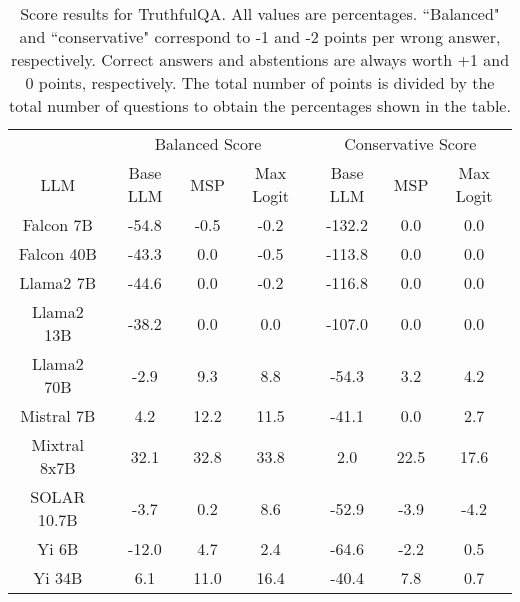 \begin{table*}
\centering
\begin{tabular}{c|c|c|c|c|c|c}
& \multicolumn{3}{c|}{Balanced Score} & \multicolumn{3}{c}{Conservative Score} \\ 
LLM & Base LLM & MSP & Max Logit & Base LLM & MSP & Max Logit\\ \hline
Falcon 7B & -54.8 & -0.5 & -0.2 & -132.2 & 0.0 & 0.0\\
Falcon 40B & -43.3 & 0.0 & -0.5 & -113.8 & 0.0 & 0.0\\
Llama2 7B & -44.6 & 0.0 & -0.2 & -116.8 & 0.0 & 0.0\\
Llama2 13B & -38.2 & 0.0 & 0.0 & -107.0 & 0.0 & 0.0\\
Llama2 70B & -2.9 & 9.3 & 8.8 & -54.3 & 3.2 & 4.2\\
Mistral 7B & 4.2 & 12.2 & 11.5 & -41.1 & 0.0 & 2.7\\
Mixtral 8x7B & 32.1 & 32.8 & 33.8 & 2.0 & 22.5 & 17.6\\
SOLAR 10.7B & -3.7 & 0.2 & 8.6 & -52.9 & -3.9 & -4.2\\
Yi 6B & -12.0 & 4.7 & 2.4 & -64.6 & -2.2 & 0.5\\
Yi 34B & 6.1 & 11.0 & 16.4 & -40.4 & 7.8 & 0.7\\
\hline
\end{tabular}
\caption{Score results for TruthfulQA. All values are percentages. ``Balanced" and ``conservative" correspond to -1 and -2 points per wrong answer, respectively. Correct answers and abstentions are always worth +1 and 0 points, respectively. The total number of points is divided by the total number of questions to obtain the percentages shown in the table.}
\label{tab:truthfulqa_score}
\end{table*}
